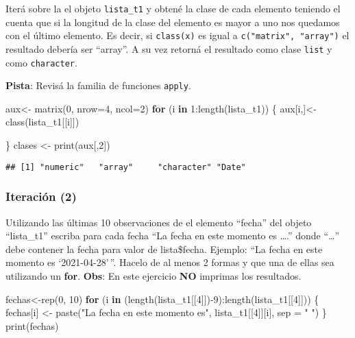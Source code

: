 \documentclass[
]{article}
\newenvironment{Shaded}{\begin{snugshade}}{\end{snugshade}}
\newcommand{\AttributeTok}[1]{\textcolor[rgb]{0.77,0.63,0.00}{#1}}
\newcommand{\ControlFlowTok}[1]{\textcolor[rgb]{0.13,0.29,0.53}{\textbf{#1}}}
\newcommand{\DecValTok}[1]{\textcolor[rgb]{0.00,0.00,0.81}{#1}}
\newcommand{\FunctionTok}[1]{\textcolor[rgb]{0.00,0.00,0.00}{#1}}
\newcommand{\NormalTok}[1]{#1}
\newcommand{\OtherTok}[1]{\textcolor[rgb]{0.56,0.35,0.01}{#1}}
\newcommand{\SpecialCharTok}[1]{\textcolor[rgb]{0.00,0.00,0.00}{#1}}
\newcommand{\StringTok}[1]{\textcolor[rgb]{0.31,0.60,0.02}{#1}}
\begin{document}
Iterá sobre la el objeto \texttt{lista\_t1} y obtené la clase de cada
elemento teniendo el cuenta que si la longitud de la clase del elemento
es mayor a uno nos quedamos con el último elemento. Es decir, si
\texttt{class(x)} es igual a \texttt{c("matrix",\ "array")} el resultado
debería ser ``array''. A su vez retorná el resultado como clase
\texttt{list} y como \texttt{character}.

\textbf{Pista}: Revisá la familia de funciones \texttt{apply}.

\begin{Shaded}
\begin{Highlighting}[]
\NormalTok{aux}\OtherTok{\textless{}{-}} \FunctionTok{matrix}\NormalTok{(}\DecValTok{0}\NormalTok{, }\AttributeTok{nrow=}\DecValTok{4}\NormalTok{, }\AttributeTok{ncol=}\DecValTok{2}\NormalTok{)}
\ControlFlowTok{for}\NormalTok{ (i }\ControlFlowTok{in} \DecValTok{1}\SpecialCharTok{:}\FunctionTok{length}\NormalTok{(lista\_t1)) \{}
\NormalTok{  aux[i,]}\OtherTok{\textless{}{-}}\FunctionTok{class}\NormalTok{(lista\_t1[[i]])}
 
\NormalTok{\}}
\NormalTok{ clases }\OtherTok{\textless{}{-}} \FunctionTok{print}\NormalTok{(aux[,}\DecValTok{2}\NormalTok{])}
\end{Highlighting}
\end{Shaded}

\begin{verbatim}
## [1] "numeric"   "array"     "character" "Date"
\end{verbatim}

\hypertarget{iteraciuxf3n-2}{%
\subsubsection{Iteración (2)}\label{iteraciuxf3n-2}}

Utilizando las últimas 10 observaciones de el elemento ``fecha'' del
objeto ``lista\_t1'' escriba para cada fecha ``La fecha en este momento
es \ldots.'' donde ``\ldots{}'' debe contener la fecha para valor de
lista\$fecha. Ejemplo: ``La fecha en este momento es `2021-04-28'\,''.
Hacelo de al menos 2 formas y que una de ellas sea utilizando un
\textbf{for}. \textbf{Obs}: En este ejercicio \textbf{NO} imprimas los
resultados.

\begin{Shaded}
\begin{Highlighting}[]
\NormalTok{fechas}\OtherTok{\textless{}{-}}\FunctionTok{rep}\NormalTok{(}\DecValTok{0}\NormalTok{, }\DecValTok{10}\NormalTok{)}
\ControlFlowTok{for}\NormalTok{ (i }\ControlFlowTok{in}\NormalTok{ (}\FunctionTok{length}\NormalTok{(lista\_t1[[}\DecValTok{4}\NormalTok{]])}\SpecialCharTok{{-}}\DecValTok{9}\NormalTok{)}\SpecialCharTok{:}\FunctionTok{length}\NormalTok{(lista\_t1[[}\DecValTok{4}\NormalTok{]])) \{}
\NormalTok{  fechas[i] }\OtherTok{\textless{}{-}} \FunctionTok{paste}\NormalTok{(}\StringTok{"La fecha en este momento es"}\NormalTok{, lista\_t1[[}\DecValTok{4}\NormalTok{]][i], }\AttributeTok{sep =} \StringTok{" "}\NormalTok{)}
\NormalTok{\}}
\FunctionTok{print}\NormalTok{(fechas)}
\end{Highlighting}
\end{Shaded}
\end{document}
